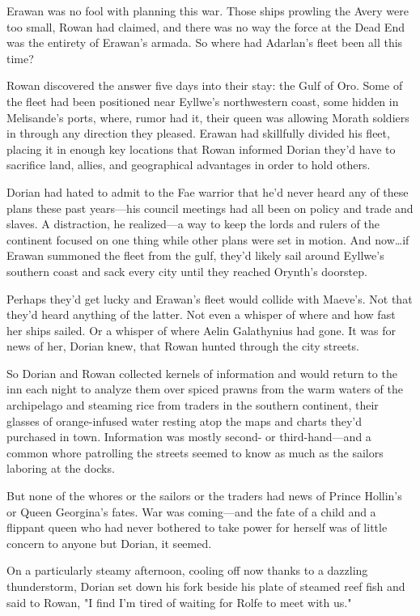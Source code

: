 Erawan was no fool with planning this war.
Those ships prowling the Avery were too small, Rowan had claimed, and there was no way the force at the Dead End was the entirety of Erawan's armada.
So where had Adarlan's fleet been all this time?

Rowan discovered the answer five days into their stay: the Gulf of Oro.
Some of the fleet had been positioned near Eyllwe's northwestern coast, some hidden in Melisande's ports, where, rumor had it, their queen was allowing Morath soldiers in through any direction they pleased.
Erawan had skillfully divided his fleet, placing it in enough key locations that Rowan informed Dorian they'd have to sacrifice land, allies, and geographical advantages in order to hold others.

Dorian had hated to admit to the Fae warrior that he'd never heard any of these plans these past years---his council meetings had all been on policy and trade and slaves.
A distraction, he realized---a way to keep the lords and rulers of the continent focused on one thing while other plans were set in motion.
And now\ldots if Erawan summoned the fleet from the gulf, they'd likely sail around Eyllwe's southern coast and sack every city until they reached Orynth's doorstep.

Perhaps they'd get lucky and Erawan's fleet would collide with Maeve's.
Not that they'd heard anything of the latter.
Not even a whisper of where and how fast her ships sailed.
Or a whisper of where Aelin Galathynius had gone.
It was for news of her, Dorian knew, that Rowan hunted through the city streets.

So Dorian and Rowan collected kernels of information and would return to the inn each night to analyze them over spiced prawns from the warm waters of the archipelago and steaming rice from traders in the southern continent, their glasses of orange-infused water resting atop the maps and charts they'd purchased in town.
Information was mostly second- or third-hand---and a common whore patrolling the streets seemed to know as much as the sailors laboring at the docks.

But none of the whores or the sailors or the traders had news of Prince Hollin's or Queen Georgina's fates.
War was coming---and the fate of a child and a flippant queen who had never bothered to take power for herself was of little concern to anyone but Dorian, it seemed.

On a particularly steamy afternoon, cooling off now thanks to a dazzling thunderstorm, Dorian set down his fork beside his plate of steamed reef fish and said to Rowan, "I find I'm tired of waiting for Rolfe to meet with us."

